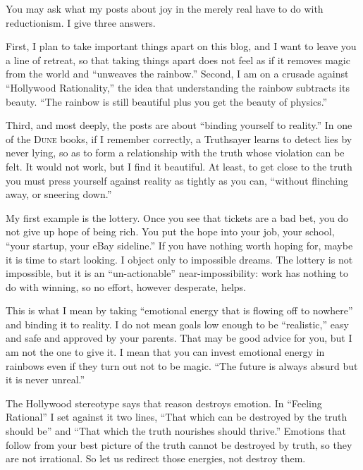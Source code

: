 
You may ask what my posts about joy in the merely real have to do with reductionism. I give three answers.

First, I plan to take important things apart on this blog, and I want to leave you a line of retreat, so that taking things apart does not feel as if it removes magic from the world and ``unweaves the rainbow.'' Second, I am on a crusade against ``Hollywood Rationality,'' the idea that understanding the rainbow subtracts its beauty. ``The rainbow is still beautiful plus you get the beauty of physics.'' 

Third, and most deeply, the posts are about ``binding yourself to reality.'' In one of the \textsc{Dune} books, if I remember correctly, a Truthsayer learns to detect lies by never lying, so as to form a relationship with the truth whose violation can be felt. It would not work, but I find it beautiful. At least, to get close to the truth you must press yourself against reality as tightly as you can, ``without flinching away, or sneering down.''

My first example is the lottery. Once you see that tickets are a bad bet, you do not give up hope of being rich. You put the hope into your job, your school, ``your startup, your eBay sideline.'' If you have nothing worth hoping for, maybe it is time to start looking. I object only to impossible dreams. The lottery is not impossible, but it is an ``un-actionable'' near-impossibility: work has nothing to do with winning, so no effort, however desperate, helps.

This is what I mean by taking ``emotional energy that is flowing off to nowhere'' and binding it to reality. I do not mean goals low enough to be ``realistic,'' easy and safe and approved by your parents. That may be good advice for you, but I am not the one to give it. I mean that you can invest emotional energy in rainbows even if they turn out not to be magic. ``The future is always absurd but it is never unreal.''

The Hollywood stereotype says that reason destroys emotion. In ``Feeling Rational'' I set against it two lines, ``That which can be destroyed by the truth should be'' and ``That which the truth nourishes should thrive.'' Emotions that follow from your best picture of the truth cannot be destroyed by truth, so they are not irrational.  So let us redirect those energies, not destroy them.

